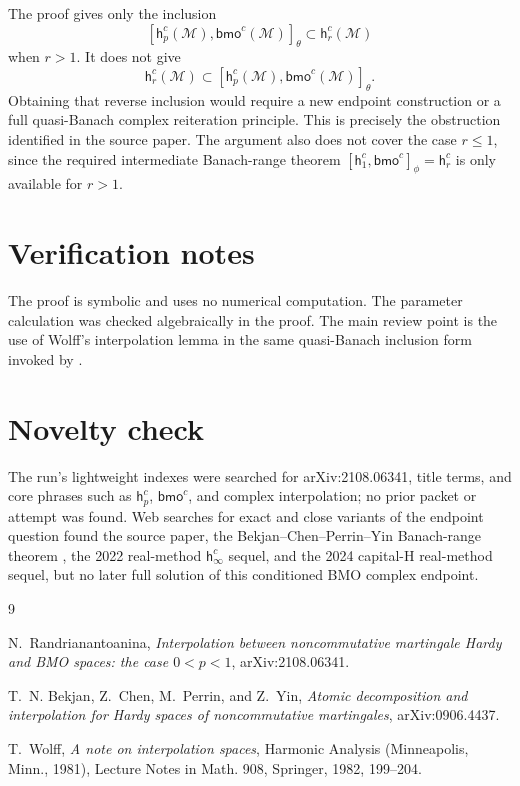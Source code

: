 \documentclass[11pt]{article}
\newcommand{\M}{\mathcal M}
\newcommand{\h}{\mathsf h}
\newcommand{\bmo}{\mathsf{bmo}}
\begin{document}
The proof gives only the inclusion
\[
[\h_p^c(\M),\bmo^c(\M)]_\theta\subset \h_r^c(\M)
\]
when \(r>1\).  It does not give
\[
\h_r^c(\M)\subset [\h_p^c(\M),\bmo^c(\M)]_\theta.
\]
Obtaining that reverse inclusion would require a new endpoint construction
or a full quasi-Banach complex reiteration principle.  This is precisely the
obstruction identified in the source paper.  The argument also does not cover
the case \(r\leq1\), since the required intermediate Banach-range theorem
\([\h_1^c,\bmo^c]_\phi=\h_r^c\) is only available for \(r>1\).

\section*{Verification notes}

The proof is symbolic and uses no numerical computation.  The parameter
calculation was checked algebraically in the proof.  The main review point is
the use of Wolff's interpolation lemma in the same quasi-Banach inclusion
form invoked by \cite[Corollary 3.19]{Ran2021}.

\section*{Novelty check}

The run's lightweight indexes were searched for arXiv:2108.06341, title
terms, and core phrases such as \(\h_p^c\), \(\bmo^c\), and complex
interpolation; no prior packet or attempt was found.  Web searches for exact
and close variants of the endpoint question found the source paper, the
Bekjan--Chen--Perrin--Yin Banach-range theorem \cite{BCPY2009}, the 2022
real-method \( \h_\infty^c \) sequel, and the 2024 capital-H real-method
sequel, but no later full solution of this conditioned BMO complex endpoint.

\begin{thebibliography}{9}

N.~Randrianantoanina,
\emph{Interpolation between noncommutative martingale Hardy and BMO spaces:
the case \(0<p<1\)},
arXiv:2108.06341.

T.~N. Bekjan, Z.~Chen, M.~Perrin, and Z.~Yin,
\emph{Atomic decomposition and interpolation for Hardy spaces of
noncommutative martingales},
arXiv:0906.4437.

T.~Wolff,
\emph{A note on interpolation spaces},
Harmonic Analysis (Minneapolis, Minn., 1981), Lecture Notes in Math. 908,
Springer, 1982, 199--204.

\end{thebibliography}
\end{document}
